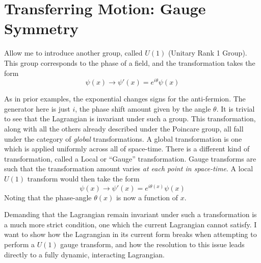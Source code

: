 \section{Transferring Motion: Gauge Symmetry} \label{sec:gauge_symmetry}

    Allow me to introduce another group, called $U(1)$ (Unitary Rank 1 Group).
    This group corresponds to the phase of a field, and the transformation takes the form
    \begin{equation}
        \psi(x) \to \psi'(x) = e^{i\theta} \psi(x)
    \end{equation}

    As in prior examples, the exponential changes signs for the anti-fermion.
    The generator here is just $i$, the phase shift amount given by the angle $\theta$.
    It is trivial to see that the Lagrangian is invariant under such a group.
    This transformation, along with all the others already described under the Poincare group,
        all fall under the category of \textit{global} transformations.
    A global transformation is one which is applied uniformly across all of space-time.
    There is a different kind of transformation, called a Local or ``Gauge'' transformation.
    Gauge transforms are such that the transformation amount varies \textit{at each point in space-time}.
    A local $U(1)$ transform would then take the form 
    \begin{equation}
        \psi(x) \to \psi'(x) = e^{i\theta(x)} \psi(x)
    \end{equation}
    Noting that the phase-angle $\theta(x)$ is now a function of $x$.

    Demanding that the Lagrangian remain invariant under such a transformation is a much more strict condition,
        one which the current Lagrangian cannot satisfy.
    I want to show how the Lagrangian in its current form breaks when attempting to perform a $U(1)$ gauge transform,
        and how the resolution to this issue leads directly to a fully dynamic, interacting Lagrangian.

